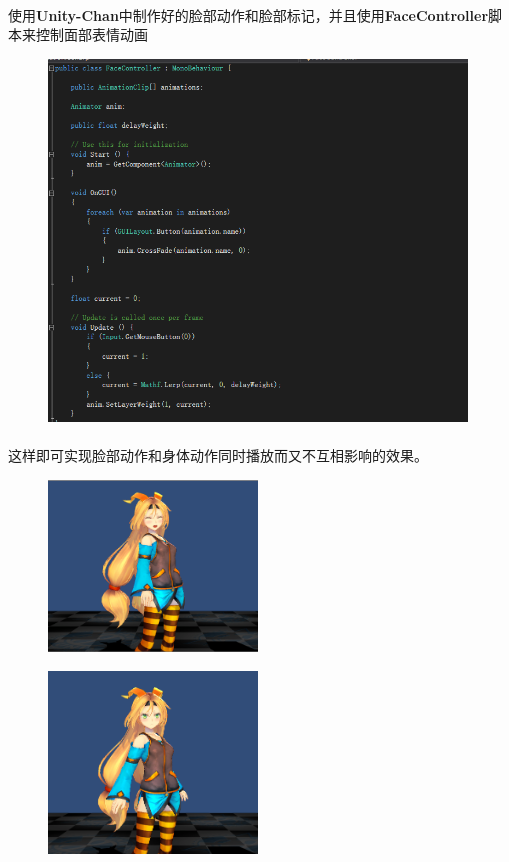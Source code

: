\documentclass{article}
\begin{document}
\paragraph{}
使用\textbf{Unity-Chan}中制作好的脸部动作和脸部标记，并且使用\textbf{FaceController}脚本来控制面部表情动画
\begin{figure}[H]
  \centering
  \includegraphics[width=30em]{code3.png}\\
  \caption{}\label{2-7}
\end{figure}
\paragraph{}
这样即可实现脸部动作和身体动作同时播放而又不互相影响的效果。
\begin{figure}[H]
\begin{minipage}{0.5\linewidth}
  \includegraphics[width=15em]{face.png}\\
  \caption{}\label{2-8}
\end{minipage}
\begin{minipage}{0.5\linewidth}
  \includegraphics[width=15em]{face1.png}\\
  \caption{}\label{2-9}
\end{minipage}
\end{figure}
\end{document}

